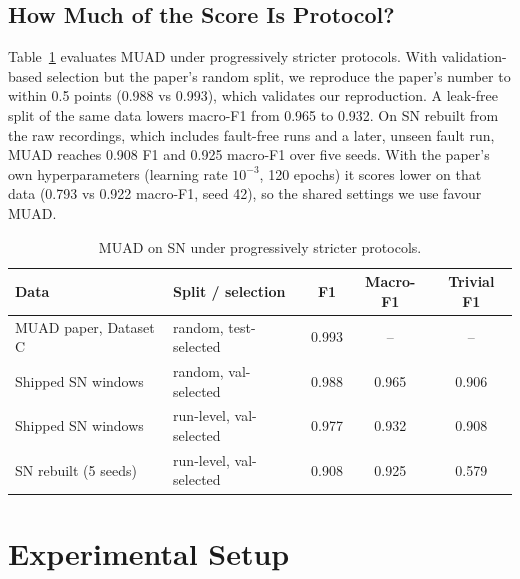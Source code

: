 \documentclass[journal]{IEEEtran}
\begin{document}
\subsection{How Much of the Score Is Protocol?}
Table~\ref{tab:protocol} evaluates MUAD under progressively stricter protocols. With validation-based
selection but the paper's random split, we reproduce the paper's number to within 0.5 points (0.988 vs
0.993), which validates our reproduction. A leak-free split of the same data lowers macro-F1 from 0.965 to
0.932. On SN rebuilt from the raw recordings, which includes fault-free runs and a later, unseen fault run,
MUAD reaches 0.908 F1 and 0.925 macro-F1 over five seeds. With the paper's own hyperparameters (learning rate
$10^{-3}$, 120 epochs) it scores lower on that data (0.793 vs 0.922 macro-F1, seed 42), so the shared settings
we use favour MUAD.

\begin{table}[!t]
\caption{MUAD on SN under progressively stricter protocols.}
\label{tab:protocol}
\centering
\footnotesize
\setlength{\tabcolsep}{4pt}
\begin{tabular}{@{}llccc@{}}
\toprule
Data & Split / selection & F1 & Macro-F1 & Trivial F1 \\
\midrule
MUAD paper, Dataset C & random, test-selected & 0.993 & -- & -- \\
Shipped SN windows & random, val-selected & 0.988 & 0.965 & 0.906 \\
Shipped SN windows & run-level, val-selected & 0.977 & 0.932 & 0.908 \\
SN rebuilt (5 seeds) & run-level, val-selected & 0.908 & 0.925 & 0.579 \\
\bottomrule
\end{tabular}
\end{table}

\section{Experimental Setup}
\label{sec:setup}
\end{document}
